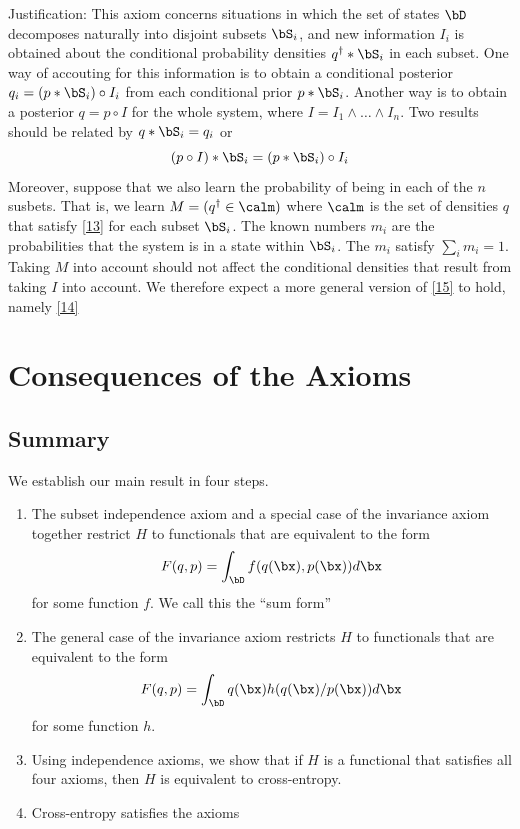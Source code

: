 \documentclass[11pt]{article}
\begin{document}
Justification: This axiom concerns situations in which the set of states \(\bD\) decomposes naturally
into disjoint subsets \(\bS_i\), and new information \(I_i\) is obtained about the conditional
probability densities \(q^\dag*\bS_i\) in each subset. One way of accouting for this information is to
obtain a conditional posterior \(q_i=(p*\bS_i)\circ I_i\) from each conditional prior \(p*\bS_i\).
Another way is to obtain a posterior \(q=p\circ I\) for the whole system, where
\(I=I_1\wedge\dots\wedge I_n\). Two results should be related by \(q*\bS_i=q_i\) or
\begin{equation}
\label{15}
(p\circ I)*\bS_i=(p*\bS_i)\circ I_i
\end{equation}
Moreover, suppose that we also learn the probability of being in each of the \(n\) susbets. That is,
we learn \(M=(q^\dag\in\calm)\) where \(\calm\) is the set of densities \(q\) that satisfy \eqref{13}
for each subset \(\bS_i\). The known numbers \(m_i\) are the probabilities that the system is in a
state within \(\bS_i\). The \(m_i\) satisfy \(\sum_im_i=1\). Taking \(M\) into account should not
affect the conditional densities that result from taking \(I\) into account. We therefore expect a
more general version of \eqref{15} to hold, namely \eqref{14}
\section{Consequences of the Axioms}
\label{sec:orga7de477}
\subsection{Summary}
\label{sec:org59b65e4}
We establish our main result in four steps.
\begin{enumerate}
\item The subset independence axiom and a special case of the invariance axiom together restrict \(H\) to
functionals that are equivalent to the form
\begin{equation*}
F(q,p)=\int_{\bD}f(q(\bx),p(\bx))d\bx
\end{equation*}
for some function \(f\). We call this the ``sum form''
\item The general case of the invariance axiom restricts \(H\) to functionals that are equivalent to the
form
\begin{equation*}
F(q,p)=\int_{\bD}q(\bx)h(q(\bx)/p(\bx))d\bx
\end{equation*}
for some function \(h\).
\item Using independence axioms, we show that if \(H\) is a functional that satisfies all four axioms,
then \(H\) is equivalent to cross-entropy.
\item Cross-entropy satisfies the axioms
\end{enumerate}
\end{document}
